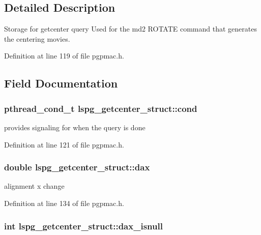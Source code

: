 \subsection{Detailed Description}
Storage for getcenter query Used for the md2 ROTATE command that generates the centering movies. 

Definition at line 119 of file pgpmac.h.

\subsection{Field Documentation}
\hypertarget{structlspg__getcenter__struct_ae0db0ff2608ab5ba3e7c1b4ad3fc0e91}{
\subsubsection[{cond}]{\setlength{\rightskip}{0pt plus 5cm}pthread\_\-cond\_\-t {\bf lspg\_\-getcenter\_\-struct::cond}}}
\label{structlspg__getcenter__struct_ae0db0ff2608ab5ba3e7c1b4ad3fc0e91}


provides signaling for when the query is done 

Definition at line 121 of file pgpmac.h.\hypertarget{structlspg__getcenter__struct_a17db52848c28852a470222ec93ae8886}{
\subsubsection[{dax}]{\setlength{\rightskip}{0pt plus 5cm}double {\bf lspg\_\-getcenter\_\-struct::dax}}}
\label{structlspg__getcenter__struct_a17db52848c28852a470222ec93ae8886}


alignment x change 

Definition at line 134 of file pgpmac.h.\hypertarget{structlspg__getcenter__struct_a621b489777d61e9db8b33b784b8d70f9}{
\subsubsection[{dax\_\-isnull}]{\setlength{\rightskip}{0pt plus 5cm}int {\bf lspg\_\-getcenter\_\-struct::dax\_\-isnull}}}
\label{structlspg__getcenter__struct_a621b489777d61e9db8b33b784b8d70f9}


